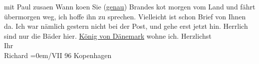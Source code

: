 \begin{ledgroupsized}[t]{13cm}
               mit Paul zusa{\geminationm}en\pend
           \pstart
           Wann ko{\geminationm}en Sie (\uline{genau})\pend
           \pstart
           Brandes ko{\geminationm}t morgen
               vom Land und fährt übermorgen weg, ich hoffe ihn zu sprechen. Vielleicht ist schon
               Brief von Ihnen da. {\pb}Ich war
               nämlich gestern nicht bei der Post, und gehe erst jetzt hin. Herrlich sind nur die
               Bäder hier. \uline{König von Dänemark} wohne ich.\pend
           \pstart
           Herzlichst{\\[\baselineskip]}Ihr{\\[\baselineskip]}\spacefill\mbox{Richard}\pend
           \leftskip=0em{}/VII 96{ }Kopenhagen\pend
           \endnumbering{}\end{ledgroupsized}  \newcommand{\dateiname}{L00570}\newcommand{\titel}{Richard Beer-Hofmann an Arthur Schnitzler, 28. 7. 1896}\newcommand{\editorInnen}{Martin Anton Müller und Gerd-Hermann Susen}
      